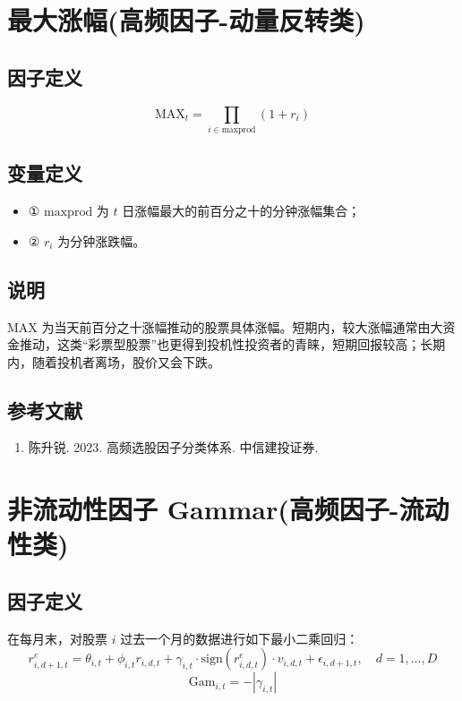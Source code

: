 \documentclass{article}
\begin{document}
\section{最大涨幅(高频因子-动量反转类)}

\subsection{因子定义}
\begin{equation}
    \mathrm{MAX}_t = \prod_{i \in \mathrm{maxprod}} (1 + r_i)
\end{equation}

\subsection{变量定义}
\begin{itemize}
    \item ① \( \mathrm{maxprod} \) 为 \( t \) 日涨幅最大的前百分之十的分钟涨幅集合；
    \item ② \( r_i \) 为分钟涨跌幅。
\end{itemize}

\subsection{说明}
MAX 为当天前百分之十涨幅推动的股票具体涨幅。短期内，较大涨幅通常由大资金推动，这类“彩票型股票”也更得到投机性投资者的青睐，短期回报较高；长期内，随着投机者离场，股价又会下跌。

\subsection{参考文献}
\begin{enumerate}
    \item 陈升锐. 2023. 高频选股因子分类体系. 中信建投证券.
\end{enumerate}

\section{非流动性因子 Gammar(高频因子-流动性类)}

\subsection{因子定义}
在每月末，对股票 \( i \) 过去一个月的数据进行如下最小二乘回归：
\begin{equation}
    r^e_{i,d+1,t} = \theta_{i,t} + \phi_{i,t} r_{i,d,t} + \gamma_{i,t} \cdot \mathrm{sign}(r_{i,d,t}^e) \cdot v_{i,d,t} + \epsilon_{i,d+1,t}, \quad d = 1, \ldots, D
\end{equation}
\begin{equation}
    \mathrm{Gam}_{i,t} = -|\gamma_{i,t}|
\end{equation}
\end{document}
